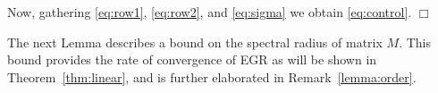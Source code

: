 \documentclass[11pt]{article}
\newtheorem{lem}[thm]{Lemma}
\begin{document}
\bigskip\noindent
Now, gathering \eqref{eq:row1}, \eqref{eq:row2}, and \eqref{eq:sigma} we obtain \eqref{eq:control}. 
\hspace*{\fill}$\Box$\medskip



\bigskip


The next Lemma describes a bound on the spectral radius of matrix $M$. This bound provides the rate of convergence of EGR as will be shown in Theorem~\ref{thm:linear}, and is further elaborated in Remark~\ref{lemma:order}.
%
%
\end{document}
